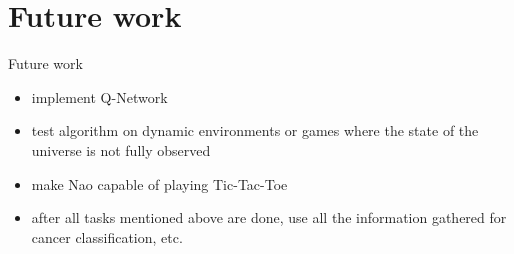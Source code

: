 \documentclass{beamer}
\begin{document}
\section{Future work}
\begin{frame}{Future work}
	\begin{itemize}
		\item implement Q-Network
		\item test algorithm on dynamic environments or games where the state of the universe is not fully observed
		\item make Nao capable of playing Tic-Tac-Toe
		\item after all tasks mentioned above are done, use all the information gathered for cancer classification, etc.
	\end{itemize}
\end{frame}

\end{document}
